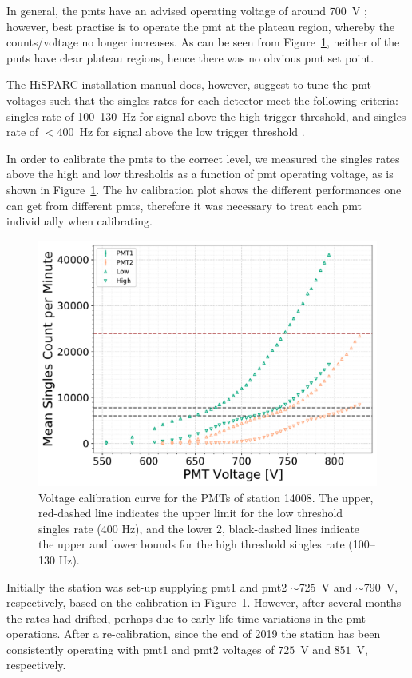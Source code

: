 In general, the \glspl{pmt} have an advised operating voltage of around 700~V \citep{fokkema_hisparc_2019}; however, best practise is to operate the \gls{pmt} at the plateau region, whereby the counts/voltage no longer increases. As can be seen from Figure~\ref{fig:PMT_cal}, neither of the \glspl{pmt} have clear plateau regions, hence there was no obvious \gls{pmt} set point.

The HiSPARC installation manual does, however, suggest to tune the \gls{pmt} voltages such that the singles rates for each detector meet the following criteria: singles rate of 100--130~Hz for signal above the high trigger threshold, and singles rate of $<$400~Hz for signal above the low trigger threshold \citep{fokkema_hisparc_2019}.

In order to calibrate the \glspl{pmt} to the correct level, we measured the singles rates above the high and low thresholds as a function of \gls{pmt} operating voltage, as is shown in Figure~\ref{fig:PMT_cal}. The \gls{hv} calibration plot shows the different performances one can get from different \glspl{pmt}, therefore it was necessary to treat each \gls{pmt} individually when calibrating.

\begin{figure}[ht!]
	\centering
	\includegraphics[width=0.8\columnwidth]{both_PMTs_post_NIM.pdf}
	\caption{Voltage calibration curve for the PMTs of station 14008. The upper, red-dashed line indicates the upper limit for the low threshold singles rate (400 Hz), and the lower 2, black-dashed lines indicate the upper and lower bounds for the high threshold singles rate (100--130 Hz).}
	\label{fig:PMT_cal}
\end{figure}

Initially the station was set-up supplying \gls{pmt}1 and \gls{pmt}2 $\sim$725~V and $\sim$790~V, respectively, based on the calibration in Figure~\ref{fig:PMT_cal}. However, after several months the rates had drifted, perhaps due to early life-time variations in the \gls{pmt} operations. After a re-calibration, since the end of 2019 the station has been consistently operating with \gls{pmt}1 and \gls{pmt}2 voltages of $725$~V and $851$~V, respectively.




